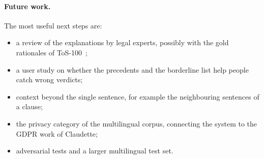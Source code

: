 \paragraph{Future work.} The most useful next steps are:
\begin{itemize}
  \item a review of the explanations by legal experts, possibly with the gold rationales of ToS-100~\citep{ruggeri2022memory};
  \item a user study on whether the precedents and the borderline list help people catch wrong verdicts;
  \item context beyond the single sentence, for example the neighbouring sentences of a clause;
  \item the privacy category of the multilingual corpus, connecting the system to the GDPR work of Claudette;
  \item adversarial tests and a larger multilingual test set.
\end{itemize}

